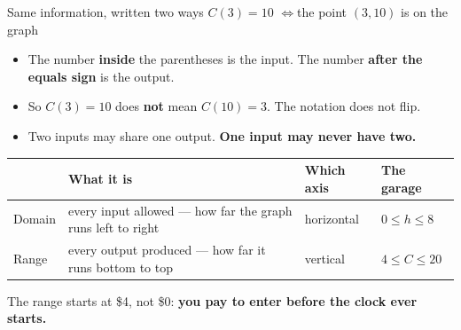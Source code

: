 \documentclass[aspectratio=169, 11pt]{beamer}
\begin{document}
\begin{frame}[t, plain]
  \begin{block}{Same information, written two ways}
    \centering\large
    $C(3)=10$ \qquad$\Longleftrightarrow$\qquad the point $(3,10)$ is on the graph
  \end{block}
  \begin{itemize}
    \setlength{\itemsep}{0.3cm}
    \item The number \textbf{inside} the parentheses is the input. The number \textbf{after the
          equals sign} is the output.
    \item So $C(3)=10$ does \textbf{not} mean $C(10)=3$. The notation does not flip.
    \item Two inputs may share one output. \textbf{One input may never have two.}
  \end{itemize}
\end{frame}

\begin{frame}[t, plain]
  \renewcommand{\arraystretch}{1.5}
  \begin{tabularx}{\textwidth}{@{}p{2.2cm} X p{2.6cm} p{3.0cm}@{}}
    & \textbf{What it is} & \textbf{Which axis} & \textbf{The garage} \\
    \hline
    Domain & every input allowed --- how far the graph runs left to right & horizontal
      & $0 \le h \le 8$ \\
    Range & every output produced --- how far it runs bottom to top & vertical
      & $4 \le C \le 20$ \\
  \end{tabularx}
  \vspace{0.35cm}

  The range starts at \$4, not \$0: \textbf{you pay to enter before the clock ever starts.}
\end{frame}
\end{document}
